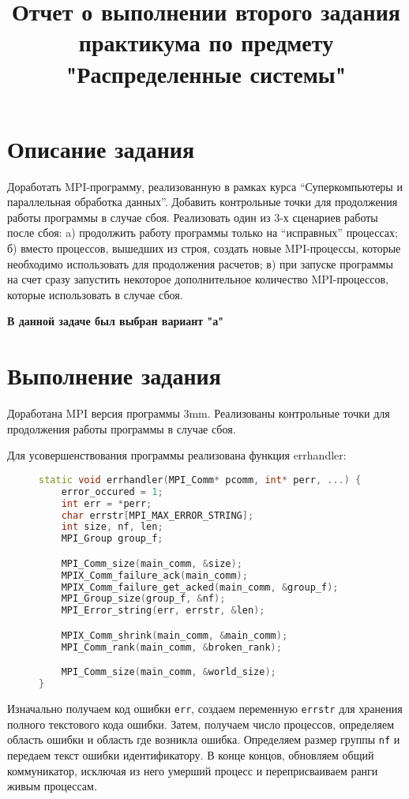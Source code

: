 \documentclass[12pt, oneside, a4paper]{article}
\begin{document}
\title{Отчет о выполнении второго задания практикума по предмету "Распределенные системы"}

\section{Описание задания}

Доработать MPI-программу, реализованную в рамках курса “Суперкомпьютеры и параллельная обработка данных”. Добавить контрольные точки для продолжения работы программы в случае сбоя. Реализовать один из 3-х сценариев работы после сбоя: a) продолжить работу программы только на “исправных” процессах; б) вместо процессов, вышедших из строя, создать новые MPI-процессы, которые необходимо использовать для продолжения расчетов; в) при запуске программы на счет сразу запустить некоторое дополнительное количество MPI-процессов, которые использовать в случае сбоя.

\textbf{В данной задаче был выбран вариант "а"}

\section{Выполнение задания}

Доработана MPI версия программы 3mm. Реализованы контрольные точки для продолжения работы программы в случае сбоя. 

Для усовершенствования программы реализована функция errhandler:

\begin{figure}[h]
\begin{lstlisting}[language=C++]
static void errhandler(MPI_Comm* pcomm, int* perr, ...) {
    error_occured = 1;
    int err = *perr;
    char errstr[MPI_MAX_ERROR_STRING];
    int size, nf, len;
    MPI_Group group_f;

    MPI_Comm_size(main_comm, &size);
    MPIX_Comm_failure_ack(main_comm);
    MPIX_Comm_failure_get_acked(main_comm, &group_f);
    MPI_Group_size(group_f, &nf);
    MPI_Error_string(err, errstr, &len);

    MPIX_Comm_shrink(main_comm, &main_comm);
    MPI_Comm_rank(main_comm, &broken_rank);

    MPI_Comm_size(main_comm, &world_size);
}
\end{lstlisting}
\end{figure}

Изначально получаем код ошибки \texttt{err}, создаем переменную \texttt{errstr} для хранения полного текстового кода ошибки. Затем, получаем число процессов, определяем область ошибки и область где возникла ошибка. Определяем размер группы \texttt{nf} и передаем текст ошибки идентификатору. В конце концов, обновляем общий коммуникатор, исключая из него умерший процесс и переприсваиваем ранги живым процессам.
\end{document}
